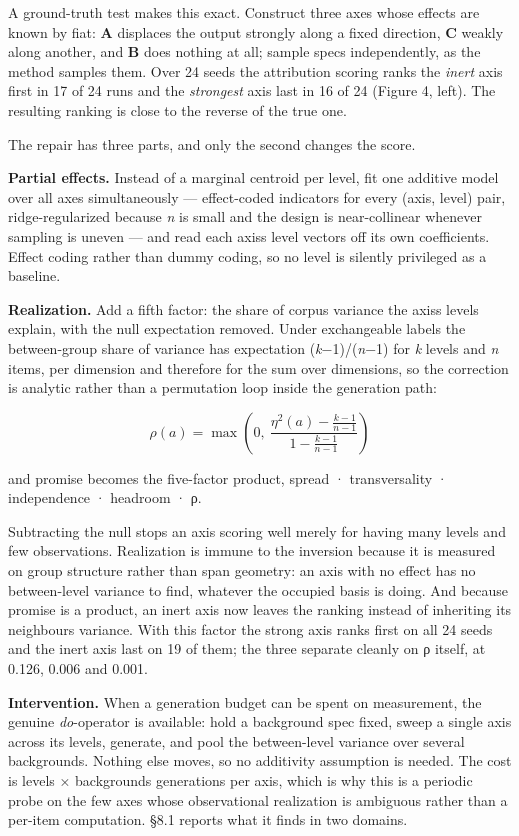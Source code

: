 \documentclass[
  10pt,
]{article}
\theoremstyle{plain}
\theoremstyle{definition}
\begin{document}
A ground-truth test makes this exact. Construct three axes whose effects
are known by fiat: \textbf{A} displaces the output strongly along a
fixed direction, \textbf{C} weakly along another, and \textbf{B} does
nothing at all; sample specs independently, as the method samples them.
Over 24 seeds the attribution scoring ranks the \emph{inert} axis first
in 17 of 24 runs and the \emph{strongest} axis last in 16 of 24 (Figure
4, left). The resulting ranking is close to the reverse of the true one.

The repair has three parts, and only the second changes the score.

\textbf{Partial effects.} Instead of a marginal centroid per level, fit
one additive model over all axes simultaneously --- effect-coded
indicators for every (axis, level) pair, ridge-regularized because
\emph{n} is small and the design is near-collinear whenever sampling is
uneven --- and read each axis\textquotesingle s level vectors off its
own coefficients. Effect coding rather than dummy coding, so no level is
silently privileged as a baseline.

\textbf{Realization.} Add a fifth factor: the share of corpus variance
the axis\textquotesingle s levels explain, with the null expectation
removed. Under exchangeable labels the between-group share of variance
has expectation (\emph{k}−1)/(\emph{n}−1) for \emph{k} levels and
\emph{n} items, per dimension and therefore for the sum over dimensions,
so the correction is analytic rather than a permutation loop inside the
generation path:

\[
\rho(a) = \max\left(0,\ \frac{\eta^2(a) - \frac{k-1}{n-1}}{1 - \frac{k-1}{n-1}}\right)
\]

and promise becomes the five-factor product, spread · transversality ·
independence · headroom · ρ.

Subtracting the null stops an axis scoring well merely for having many
levels and few observations. Realization is immune to the inversion
because it is measured on group structure rather than span geometry: an
axis with no effect has no between-level variance to find, whatever the
occupied basis is doing. And because promise is a product, an inert axis
now leaves the ranking instead of inheriting its
neighbours\textquotesingle{} variance. With this factor the strong axis
ranks first on all 24 seeds and the inert axis last on 19 of them; the
three separate cleanly on ρ itself, at 0.126, 0.006 and 0.001.

\textbf{Intervention.} When a generation budget can be spent on
measurement, the genuine \emph{do}-operator is available: hold a
background spec fixed, sweep a single axis across its levels, generate,
and pool the between-level variance over several backgrounds. Nothing
else moves, so no additivity assumption is needed. The cost is
\textbar levels\textbar{} × \textbar backgrounds\textbar{} generations
per axis, which is why this is a periodic probe on the few axes whose
observational realization is ambiguous rather than a per-item
computation. §8.1 reports what it finds in two domains.
\end{document}
